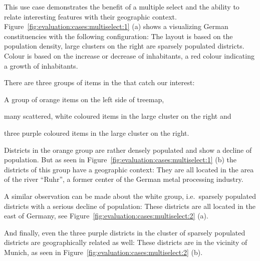 This use case demonstrates the benefit of a multiple select and the ability to relate interesting features with their geographic context.
Figure~\ref{fig:evaluation:cases:multiselect:1} (a) shows a \tmap{} visualizing German constituencies with the following configuration:
The layout is based on the population density, large clusters on the right are sparsely populated districts.
Colour is based on the increase or decrease of inhabitants, a red colour indicating a growth of inhabitants.

There are three groups of items in the \tmap{} that catch our interest:
\begin{enumerate*}[label=(\arabic*)]
  \item A group of orange items on the left side of treemap,
  \item many scattered, white coloured items in the large cluster on the right and
  \item three purple coloured items in the large cluster on the right.
\end{enumerate*}

Districts in the orange group are rather densely populated and show a decline of population.
But as seen in Figure~\ref{fig:evaluation:cases:multiselect:1} (b) the districts of this group have a geographic context:
They are all located in the area of the river ``Ruhr'', a former center of the German metal processing industry.

A similar observation can be made about the white group, i.e.\ sparsely populated districts with a serious decline of population:
These districts are all located in the east of Germany, see Figure~\ref{fig:evaluation:cases:multiselect:2} (a).

And finally, even the three purple districts in the cluster of sparsely populated districts are geographically related as well:
These districts are in the vicinity of Munich, as seen in Figure~\ref{fig:evaluation:cases:multiselect:2} (b).



